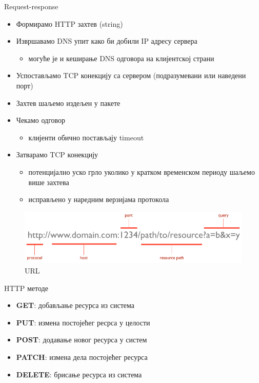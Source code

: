 \documentclass[aspectratio=169]{beamer}
\begin{document}
\begin{frame}[allowframebreaks]{Request-response}
        \begin{itemize}
            \item Формирамо HTTP захтев (string)
            \item Извршавамо DNS упит како би добили IP адресу сервера
            \begin{itemize}
                \item могуће је и кеширање DNS одговора на клијентској страни
            \end{itemize}
            \item Успостављамо TCP конекцију са сервером (подразумевани или наведени порт)
            \item Захтев шаљемо издељен у пакете
            \item Чекамо одговор
            \begin{itemize}
                \item клијенти обично постављају timeout
            \end{itemize}
            \item Затварамо TCP конекцију
            \begin{itemize}
                \item потенцијално уско грло уколико у кратком временском периоду шаљемо више захтева
                \item исправљено у наредним верзијама протокола
            \end{itemize}
        \end{itemize}
        
        \framebreak
        
        \begin{figure}
            \centering
            \includegraphics[width=\textwidth,height=\textheight,keepaspectratio]{images/url.png}
            \caption{URL}
            \label{fig:url}
        \end{figure}
    \end{frame}
    
    \begin{frame}{HTTP методе}
        \begin{itemize}
            \item \textbf{GET}: добављање ресурса из система
            \item \textbf{PUT}: измена постојећег ресрса у целости
            \item \textbf{POST}: додавање новог ресурса у систем
            \item \textbf{PATCH}: измена дела постојећег ресурса
            \item \textbf{DELETE}: брисање ресурса из система
        \end{itemize}
    \end{frame}
    
\end{document}
